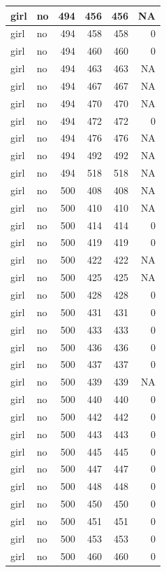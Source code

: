 \documentclass[man]{apa6}
\begin{document}
\begin{tabular}{l|l|r|r|r|r}
\hline
girl & no & 494 & 456 & 456 & NA\\
\hline
girl & no & 494 & 458 & 458 & 0\\
\hline
girl & no & 494 & 460 & 460 & 0\\
\hline
girl & no & 494 & 463 & 463 & NA\\
\hline
girl & no & 494 & 467 & 467 & NA\\
\hline
girl & no & 494 & 470 & 470 & NA\\
\hline
girl & no & 494 & 472 & 472 & 0\\
\hline
girl & no & 494 & 476 & 476 & NA\\
\hline
girl & no & 494 & 492 & 492 & NA\\
\hline
girl & no & 494 & 518 & 518 & NA\\
\hline
girl & no & 500 & 408 & 408 & NA\\
\hline
girl & no & 500 & 410 & 410 & NA\\
\hline
girl & no & 500 & 414 & 414 & 0\\
\hline
girl & no & 500 & 419 & 419 & 0\\
\hline
girl & no & 500 & 422 & 422 & NA\\
\hline
girl & no & 500 & 425 & 425 & NA\\
\hline
girl & no & 500 & 428 & 428 & 0\\
\hline
girl & no & 500 & 431 & 431 & 0\\
\hline
girl & no & 500 & 433 & 433 & 0\\
\hline
girl & no & 500 & 436 & 436 & 0\\
\hline
girl & no & 500 & 437 & 437 & 0\\
\hline
girl & no & 500 & 439 & 439 & NA\\
\hline
girl & no & 500 & 440 & 440 & 0\\
\hline
girl & no & 500 & 442 & 442 & 0\\
\hline
girl & no & 500 & 443 & 443 & 0\\
\hline
girl & no & 500 & 445 & 445 & 0\\
\hline
girl & no & 500 & 447 & 447 & 0\\
\hline
girl & no & 500 & 448 & 448 & 0\\
\hline
girl & no & 500 & 450 & 450 & 0\\
\hline
girl & no & 500 & 451 & 451 & 0\\
\hline
girl & no & 500 & 453 & 453 & 0\\
\hline
girl & no & 500 & 460 & 460 & 0\\

\end{tabular}
\end{document}
